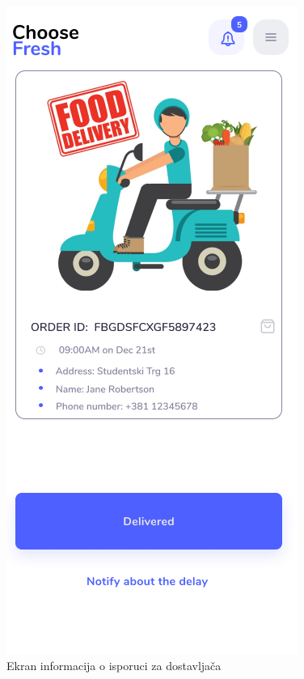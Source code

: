 \begin{figure}[H]
	\begin{center}
		\includegraphics[scale=0.3]{UI/deliveryman_order_info.png}
    		\caption{Ekran informacija o isporuci za dostavljača}
    \label{fig:DeliverymanOrderInfo}
    \end{center}
\end{figure}

